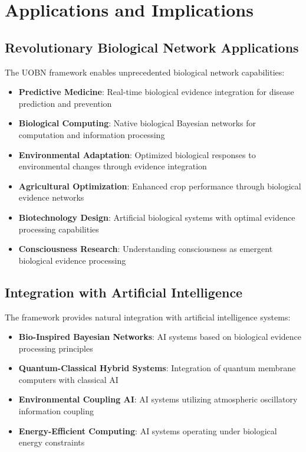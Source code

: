 \documentclass[12pt,a4paper]{article}
\begin{document}
\begin{table}[H]
\begin{table}[H]
\section{Applications and Implications}

\subsection{Revolutionary Biological Network Applications}

The UOBN framework enables unprecedented biological network capabilities:

\begin{itemize}
\item \textbf{Predictive Medicine}: Real-time biological evidence integration for disease prediction and prevention
\item \textbf{Biological Computing}: Native biological Bayesian networks for computation and information processing
\item \textbf{Environmental Adaptation}: Optimized biological responses to environmental changes through evidence integration
\item \textbf{Agricultural Optimization}: Enhanced crop performance through biological evidence networks
\item \textbf{Biotechnology Design}: Artificial biological systems with optimal evidence processing capabilities
\item \textbf{Consciousness Research}: Understanding consciousness as emergent biological evidence processing
\end{itemize}

\subsection{Integration with Artificial Intelligence}

The framework provides natural integration with artificial intelligence systems:

\begin{itemize}
\item \textbf{Bio-Inspired Bayesian Networks}: AI systems based on biological evidence processing principles
\item \textbf{Quantum-Classical Hybrid Systems}: Integration of quantum membrane computers with classical AI
\item \textbf{Environmental Coupling AI}: AI systems utilizing atmospheric oscillatory information coupling
\item \textbf{Energy-Efficient Computing}: AI systems operating under biological energy constraints
\end{itemize}


\end{table}
\end{table}
\end{document}
